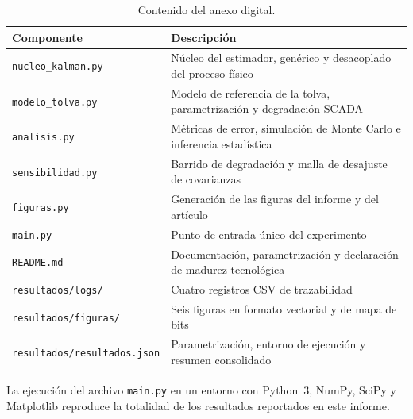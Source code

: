 \begin{table}[H]
\centering
\caption{Contenido del anexo digital.}
\label{tab:anexo-digital}
\footnotesize
\begin{tabular}{@{}p{4.6cm}p{8.6cm}@{}}
\toprule
\textbf{Componente} & \textbf{Descripción}\\
\midrule
\texttt{nucleo\_kalman.py} &
Núcleo del estimador, genérico y desacoplado del proceso físico\\
\texttt{modelo\_tolva.py} &
Modelo de referencia de la tolva, parametrización y degradación SCADA\\
\texttt{analisis.py} &
Métricas de error, simulación de Monte Carlo e inferencia estadística\\
\texttt{sensibilidad.py} &
Barrido de degradación y malla de desajuste de covarianzas\\
\texttt{figuras.py} &
Generación de las figuras del informe y del artículo\\
\texttt{main.py} &
Punto de entrada único del experimento\\
\texttt{README.md} &
Documentación, parametrización y declaración de madurez tecnológica\\
\texttt{resultados/logs/} &
Cuatro registros CSV de trazabilidad\\
\texttt{resultados/figuras/} &
Seis figuras en formato vectorial y de mapa de bits\\
\texttt{resultados/resultados.json} &
Parametrización, entorno de ejecución y resumen consolidado\\
\bottomrule
\end{tabular}
\end{table}

La ejecución del archivo \texttt{main.py} en un entorno con Python~3, NumPy,
SciPy y Matplotlib reproduce la totalidad de los resultados reportados en este
informe.
